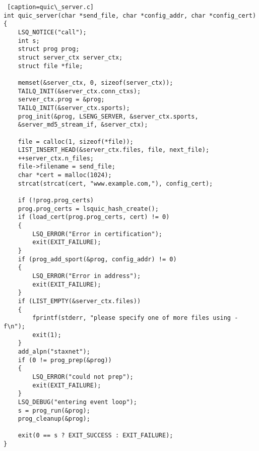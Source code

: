 \begin{lstlisting} [caption=quic\_server.c]
int quic_server(char *send_file, char *config_addr, char *config_cert)
{
	LSQ_NOTICE("call");
	int s;
	struct prog prog;
	struct server_ctx server_ctx;
	struct file *file;
	
	memset(&server_ctx, 0, sizeof(server_ctx));
	TAILQ_INIT(&server_ctx.conn_ctxs);
	server_ctx.prog = &prog;
	TAILQ_INIT(&server_ctx.sports);
	prog_init(&prog, LSENG_SERVER, &server_ctx.sports,
	&server_md5_stream_if, &server_ctx);
	
	file = calloc(1, sizeof(*file));
	LIST_INSERT_HEAD(&server_ctx.files, file, next_file);
	++server_ctx.n_files;
	file->filename = send_file;
	char *cert = malloc(1024);
	strcat(strcat(cert, "www.example.com,"), config_cert);
	
	if (!prog.prog_certs)
	prog.prog_certs = lsquic_hash_create();
	if (load_cert(prog.prog_certs, cert) != 0)
	{
		LSQ_ERROR("Error in certification");
		exit(EXIT_FAILURE);
	}
	if (prog_add_sport(&prog, config_addr) != 0)
	{
		LSQ_ERROR("Error in address");
		exit(EXIT_FAILURE);
	}
	if (LIST_EMPTY(&server_ctx.files))
	{
		fprintf(stderr, "please specify one of more files using -f\n");
		exit(1);
	}
	add_alpn("staxnet");
	if (0 != prog_prep(&prog))
	{
		LSQ_ERROR("could not prep");
		exit(EXIT_FAILURE);
	}
	LSQ_DEBUG("entering event loop");
	s = prog_run(&prog);
	prog_cleanup(&prog);
	
	exit(0 == s ? EXIT_SUCCESS : EXIT_FAILURE);
}

\end{lstlisting}
